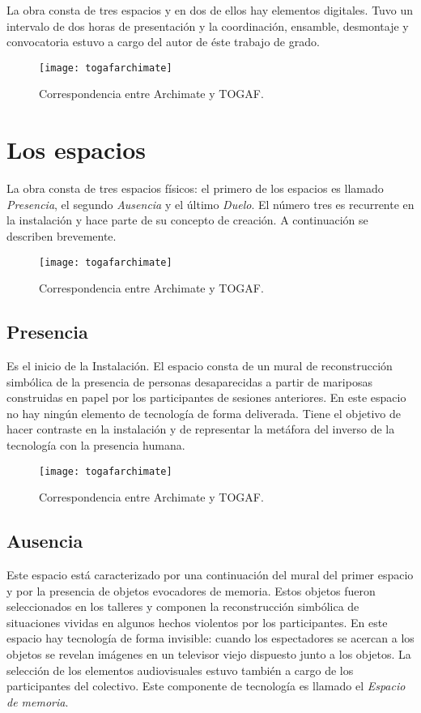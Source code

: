 La obra consta de tres espacios y en dos de ellos hay elementos digitales. Tuvo un intervalo de dos horas de presentación y la coordinación, ensamble, desmontaje y convocatoria estuvo a cargo del autor de éste trabajo de grado.

\begin{figure}[h]\label{togafarchimate}
\centering
\texttt{[image: togafarchimate]}
\caption{Correspondencia entre Archimate y TOGAF.}
\end{figure}

\section{Los espacios}

La obra consta de tres espacios físicos: el primero de los espacios es llamado \textit{Presencia}, el segundo \textit{Ausencia} y el último \textit{Duelo}. El número tres es recurrente en la instalación y hace parte de su concepto de creación. A continuación se describen brevemente.

\begin{figure}[h]\label{togafarchimate}
\centering
\texttt{[image: togafarchimate]}
\caption{Correspondencia entre Archimate y TOGAF.}
\end{figure}

\subsection{Presencia}

Es el inicio de la Instalación. El espacio consta de un mural de reconstrucción simbólica de la presencia de personas desaparecidas a partir de mariposas construidas en papel por los participantes de sesiones anteriores. En este espacio no hay ningún elemento de tecnología de forma deliverada. Tiene el objetivo de hacer contraste en la instalación y de representar la metáfora del inverso de la tecnología con la presencia humana.

\begin{figure}[h]\label{togafarchimate}
\centering
\texttt{[image: togafarchimate]}
\caption{Correspondencia entre Archimate y TOGAF.}
\end{figure}

\subsection{Ausencia}

Este espacio está caracterizado por una continuación del mural del primer espacio y por la presencia de objetos evocadores de memoria. Estos objetos fueron seleccionados en los talleres y componen la reconstrucción simbólica de situaciones vividas en algunos hechos violentos por los participantes. En este espacio hay tecnología de forma invisible: cuando los espectadores se acercan a los objetos se revelan imágenes en un televisor viejo dispuesto junto a los objetos. La selección de los elementos audiovisuales estuvo también a cargo de los participantes del colectivo. Este componente de tecnología es llamado el \textit{Espacio de memoria}.

